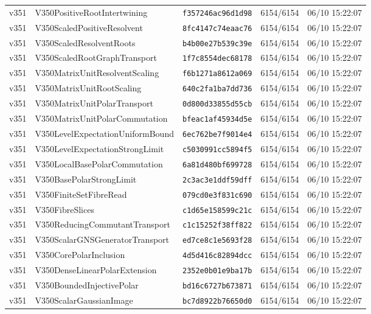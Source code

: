 \documentclass[11pt]{article}
\theoremstyle{definition}\newtheorem{deriv}{Derivação}
\begin{document}
{\begin{longtable}{@{}lllll@{}}
v351 & V350PositiveRootIntertwining & \texttt{f357246ac96d1d98} & 6154/6154 & 06/10 15:22:07 \\
v351 & V350ScaledPositiveResolvent & \texttt{8fc4147c74eaac76} & 6154/6154 & 06/10 15:22:07 \\
v351 & V350ScaledResolventRoots & \texttt{b4b00e27b539c39e} & 6154/6154 & 06/10 15:22:07 \\
v351 & V350ScaledRootGraphTransport & \texttt{1f7c8554dec68178} & 6154/6154 & 06/10 15:22:07 \\
v351 & V350MatrixUnitResolventScaling & \texttt{f6b1271a8612a069} & 6154/6154 & 06/10 15:22:07 \\
v351 & V350MatrixUnitRootScaling & \texttt{640c2fa1ba7dd736} & 6154/6154 & 06/10 15:22:07 \\
v351 & V350MatrixUnitPolarTransport & \texttt{0d800d33855d55cb} & 6154/6154 & 06/10 15:22:07 \\
v351 & V350MatrixUnitPolarCommutation & \texttt{bfeac1af45934d5e} & 6154/6154 & 06/10 15:22:07 \\
v351 & V350LevelExpectationUniformBound & \texttt{6ec762be7f9014e4} & 6154/6154 & 06/10 15:22:07 \\
v351 & V350LevelExpectationStrongLimit & \texttt{c5030991cc5894f5} & 6154/6154 & 06/10 15:22:07 \\
v351 & V350LocalBasePolarCommutation & \texttt{6a81d480bf699728} & 6154/6154 & 06/10 15:22:07 \\
v351 & V350BasePolarStrongLimit & \texttt{2c3ac3e1ddf59dff} & 6154/6154 & 06/10 15:22:07 \\
v351 & V350FiniteSetFibreRead & \texttt{079cd0e3f831c690} & 6154/6154 & 06/10 15:22:07 \\
v351 & V350FibreSlices & \texttt{c1d65e158599c21c} & 6154/6154 & 06/10 15:22:07 \\
v351 & V350ReducingCommutantTransport & \texttt{c1c15252f38ff822} & 6154/6154 & 06/10 15:22:07 \\
v351 & V350ScalarGNSGeneratorTransport & \texttt{ed7ce8c1e5693f28} & 6154/6154 & 06/10 15:22:07 \\
v351 & V350CorePolarInclusion & \texttt{4d5d416c82894dcc} & 6154/6154 & 06/10 15:22:07 \\
v351 & V350DenseLinearPolarExtension & \texttt{2352e0b01e9ba17b} & 6154/6154 & 06/10 15:22:07 \\
v351 & V350BoundedInjectivePolar & \texttt{bd16c6727b673871} & 6154/6154 & 06/10 15:22:07 \\
v351 & V350ScalarGaussianImage & \texttt{bc7d8922b76650d0} & 6154/6154 & 06/10 15:22:07 \\

\end{longtable}}
\end{document}
